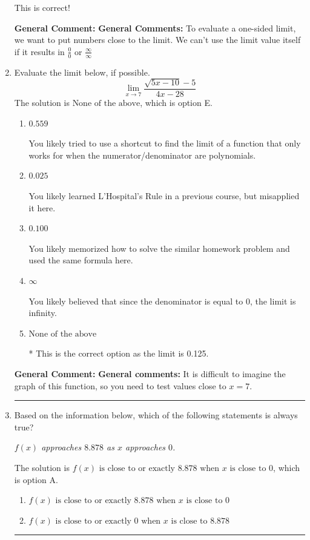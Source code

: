 \documentclass{extbook}[14pt]
\newcommand{\litem}[1]{\item #1

\rule{\textwidth}{0.4pt}}
\begin{document}
\begin{enumerate}
{\begin{enumerate}[label=\Alph*.]
This is correct!
\end{enumerate}

\textbf{General Comment:} \textbf{General Comments:} To evaluate a one-sided limit, we want to put numbers close to the limit. We can't use the limit value itself if it results in $\frac{0}{0}$ or $\frac{\infty}{\infty}$
}
\litem{
Evaluate the limit below, if possible.
\[ \lim_{x \rightarrow 7} \frac{\sqrt{5x - 10} - 5}{4x - 28} \]The solution is \( \text{None of the above} \), which is option E.\begin{enumerate}[label=\Alph*.]
\item \( 0.559 \)

You likely tried to use a shortcut to find the limit of a function that only works for when the numerator/denominator are polynomials.
\item \( 0.025 \)

You likely learned L'Hospital's Rule in a previous course, but misapplied it here.
\item \( 0.100 \)

You likely memorized how to solve the similar homework problem and used the same formula here.
\item \( \infty \)

You likely believed that since the denominator is equal to 0, the limit is infinity.
\item \( \text{None of the above} \)

* This is the correct option as the limit is 0.125.
\end{enumerate}

\textbf{General Comment:} \textbf{General comments:} It is difficult to imagine the graph of this function, so you need to test values close to $x = 7$.
}
\litem{
Based on the information below, which of the following statements is always true?

\begin{center}
    \textit{ $f(x)$ approaches $8.878$ as $x$ approaches $0$. }
\end{center}
The solution is \( f(x) \text{ is close to or exactly } 8.878 \text{ when } x \text{ is close to } 0 \), which is option A.\begin{enumerate}[label=\Alph*.]
\item \( f(x) \text{ is close to or exactly } 8.878 \text{ when } x \text{ is close to } 0 \)


\item \( f(x) \text{ is close to or exactly } 0 \text{ when } x \text{ is close to } 8.878 \)



\end{enumerate}}
\end{enumerate}
\end{document}
